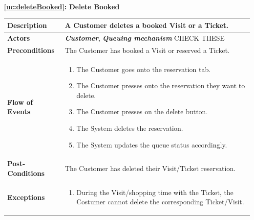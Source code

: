 \documentclass[a4paper, 10pt, oneside]{article}
\newcommand*{\lorenzo}[1]{\textcolor{BurntOrange}{#1}}
\begin{document}
\begin{center}
{\textbf{\ref{uc:deleteBooked}: Delete Booked}}
\end{center}
\begin{tabularx}{\linewidth}{| l | X |}
	
	\hline
	\textbf{Description} & A Customer deletes a booked Visit or a Ticket.\\
	

	\hline
	\textbf{Actors} & \textbf{\textit{Customer}}, \textit{\textbf{Queuing mechanism}}  \lorenzo{CHECK THESE}\\
	
	\hline
	\textbf{Preconditions} & The Customer has booked a Visit or reserved a Ticket.\\
	
	\hline
	\textbf{Flow of Events} & \parbox{0.7\textwidth}{	
		\begin{enumerate}
			\item The Customer goes onto the reservation tab.
			\item The Customer presses onto the reservation they want to delete.
			\item The Customer presses on the delete button.
			\item The System deletes the reservation.
			\item The System updates the queue status accordingly.
	\end{enumerate}}\\
	
	\hline
	\textbf{Post-Conditions} & The Customer has deleted their Visit/Ticket reservation.\\
	
	\hline
	\textbf{Exceptions} & \parbox{0.7\textwidth}{ \begin{enumerate}
			\item During the Visit/shopping time with the Ticket, the Costumer cannot delete the corresponding Ticket/Visit.
		\end{enumerate}}\\

	\hline
\end{tabularx}
\end{document}
